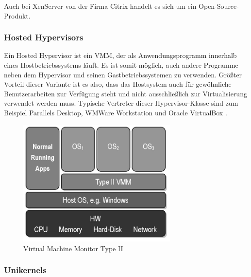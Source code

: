 Auch bei XenServer von der Firma Citrix handelt es sich um ein Open-Source-Produkt.

\subsubsection{Hosted Hypervisors}

Ein Hosted Hypervisor ist ein \ac{VMM}, der als Anwendungsprogramm innerhalb eines Hostbetriebssystems läuft. Es ist somit möglich, auch andere Programme neben dem Hypervisor und seinen Gastbetriebssystemen zu verwenden. Größter Vorteil dieser Variante ist es also, dass das Hostsystem auch für gewöhnliche Benutzerarbeiten zur Verfügung steht und nicht ausschließlich zur Virtualisierung verwendet werden muss. Typische Vertreter dieser Hypervisor-Klasse sind zum Beispiel Parallels Desktop, WMWare Workstation und Oracle VirtualBox \citep{wiki:004}.

\begin{figure}[!ht]
  \begin{center}
    \includegraphics[width=8cm]{bilder/VMM-Type2.jpg}
    \caption{Virtual Machine Monitor Type II \citep{wiki:003}}
  \end{center}
\end{figure}

\subsubsection{Unikernels}

